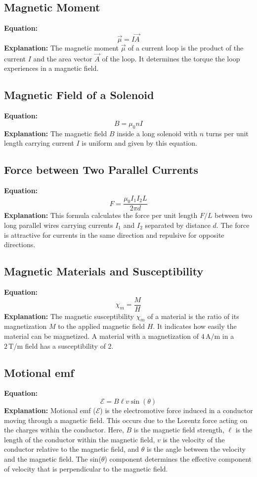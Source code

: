 \documentclass{article}
\begin{document}
\subsection*{Magnetic Moment}
\textbf{Equation:} 
\[ \vec{\mu} = I\vec{A} \]
\textbf{Explanation:} 
The magnetic moment \( \vec{\mu} \) of a current loop is the product of the current \( I \) and the area vector \( \vec{A} \) of the loop. It determines the torque the loop experiences in a magnetic field.

\subsection*{Magnetic Field of a Solenoid}
\textbf{Equation:} 
\[ B = \mu_0 n I \]
\textbf{Explanation:} 
The magnetic field \( B \) inside a long solenoid with \( n \) turns per unit length carrying current \( I \) is uniform and given by this equation.

\subsection*{Force between Two Parallel Currents}
\textbf{Equation:} 
\[ F = \frac{\mu_0 I_1 I_2 L}{2\pi d} \]
\textbf{Explanation:} 
This formula calculates the force per unit length \( F/L \) between two long parallel wires carrying currents \( I_1 \) and \( I_2 \) separated by distance \( d \). The force is attractive for currents in the same direction and repulsive for opposite directions.

\subsection*{Magnetic Materials and Susceptibility}
\textbf{Equation:} 
\[ \chi_m = \frac{M}{H} \]
\textbf{Explanation:} 
The magnetic susceptibility \( \chi_m \) of a material is the ratio of its magnetization \( M \) to the applied magnetic field \( H \). It indicates how easily the material can be magnetized.
A material with a magnetization of \( 4 \, \text{A/m} \) in a \( 2 \, \text{T/m} \) field has a susceptibility of 2.

\subsection*{Motional emf}
\textbf{Equation:} 
\[ \mathcal{E} = B \ell v \sin(\theta) \]
\textbf{Explanation:} 
Motional emf (\( \mathcal{E} \)) is the electromotive force induced in a conductor moving through a magnetic field. This occurs due to the Lorentz force acting on the charges within the conductor. Here, \( B \) is the magnetic field strength, \( \ell \) is the length of the conductor within the magnetic field, \( v \) is the velocity of the conductor relative to the magnetic field, and \( \theta \) is the angle between the velocity and the magnetic field. The sin(\( \theta \)) component determines the effective component of velocity that is perpendicular to the magnetic field.
\end{document}
